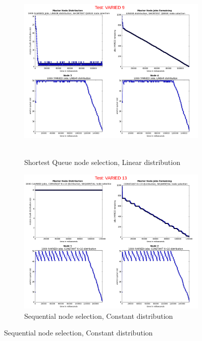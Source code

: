 \documentclass{article}
\begin{document}
\begin{figure}
  \begin{subfigure}[b]{0.5\linewidth}
    \centering
    \hbox{\hspace{-5.0em} \includegraphics[width=1.2\linewidth]{combined_varied_overview/case_varied_9} }
    \caption{Shortest Queue node selection, Linear distribution} 
    \label{testVaried9} 
    \vspace{4ex}
  \end{subfigure}%
  \begin{subfigure}[b]{0.5\linewidth}
    \centering
    \includegraphics[width=1.2\linewidth]{combined_varied_overview/case_varied_13} 
    \caption{Sequential node selection, Constant distribution} 
    \label{testVaried13} 
    \vspace{4ex}
  \end{subfigure} 
  

\end{figure}
\end{document}
